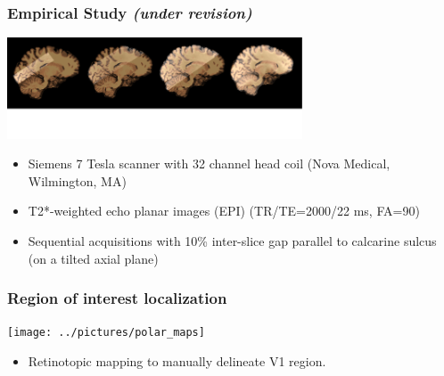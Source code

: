 \documentclass{beamer}
\begin{document}


  \begin{frame}
    \frametitle{Empirical Study \textit{(under revision)}}
        \begin{center}
            \includegraphics[height=3cm]{../pictures/acquisition}
        \end{center}
        \begin{itemize}
         \item Siemens 7 Tesla scanner with 32 channel head coil (Nova Medical, Wilmington, MA)
         \item T2*-weighted echo planar images (EPI) (TR/TE=2000/22 ms, FA=90\textdegree)
         \item Sequential acquisitions with 10\% inter-slice gap parallel to calcarine sulcus (on a tilted 
         axial plane)
        \end{itemize}  
    \end{frame}  
    
  \begin{frame}
    \frametitle{Region of interest localization}
        \begin{center}
            \texttt{[image: ../pictures/polar\_maps]}
        \end{center}
                \begin{itemize}
         \item Retinotopic mapping to manually delineate V1 region.
        \end{itemize} 
    \end{frame} 
\end{document}

